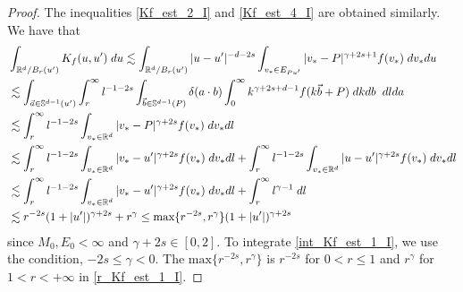 \documentclass[reqno,10pt]{amsart}
\numberwithin{equation}{section}
\begin{document}
\begin{proof}
\noindent The inequalities \eqref{Kf_est_2_I} and \eqref{Kf_est_4_I} are obtained similarly. We have that
\begin{align}
    &\int_{\mathbb{R}^d/B_{r}(u')}K_f(u,u')\; du
    \lesssim
     \int_{\mathbb{R}^d/B_{r}(u')}|u-u'|^{-d-2s} \int_{v_*\in E_{Pu'}}|v_*-P|^{\gamma+2s+1}f(v_*) \; dv_*du  \notag \\
    &\lesssim \int_{\vec{a} \in \mathbb{S}^{d-1}(u')} \int_r^{\infty} l^{-1-2s} \int_{\vec{b}\in \mathbb{S}^{d-1}(P)} \delta(a \cdot b)\int_0^{\infty} {k}^{\gamma+2s+d-1}f(k\vec{b}+P) \; dk db \;\; dlda  \notag \\
    &\lesssim \int_r^{\infty} l^{-1-2s} \int_{v_* \in \mathbb{R}^{d}} {|v_*-P|^{\gamma+2s}}f(v_*) \; dv_*  dl  \notag \\
    & \lesssim \int_r^{\infty} l^{-1-2s} \int_{v_* \in \mathbb{R}^{d}} {|v_*-u'|^{\gamma+2s}}f(v_*) \; dv_*  dl + \int_r^{\infty} l^{-1-2s} \int_{v_* \in \mathbb{R}^{d}} {|u-u'|^{\gamma+2s}}f(v_*) \; dv_*  dl  \notag  \\
    &\lesssim \int_r^{\infty} l^{-1-2s} \int_{v_* \in \mathbb{R}^{d}} {|v_*-u'|^{\gamma+2s}}f(v_*) \; dv_*  dl + \int_r^{\infty} l^{\gamma-1}\; dl  \label{int_Kf_est_1_I} \\
    &\lesssim r^{-2s}(1+|u'|)^{\gamma+2s}+r^{\gamma}
    \leq \text{max}\{r^{-2s},r^{\gamma}\}(1+|u'|)^{\gamma+2s} \label{r_Kf_est_1_I}
\end{align} since $M_0, E_0 < \infty$ and $\gamma+2s \in [0,2].$ To integrate \eqref{int_Kf_est_1_I}, we use the condition, $-2s \leq \gamma<0$. The $\text{max}\{r^{-2s},r^{\gamma}\}$ is $r^{-2s}$ for $0<r\leq 1$ and $r^{\gamma}$ for $1<r<+\infty$ in \eqref{r_Kf_est_1_I}.
\end{proof} \vspace{3mm}
\end{document}
